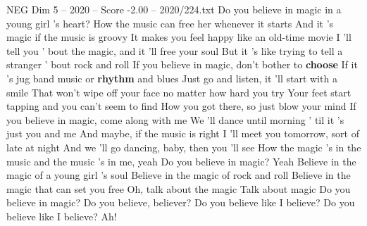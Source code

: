 \begin{textsample}{NEG Dim 5 – 2020 – Score -2.00 – 2020/224.txt}  \label{ex:f5_neg_021}
Do you believe in magic in a young girl 's heart?
How the music can free her whenever it starts And it 's magic if the music is groovy It makes you feel happy like an old-time movie I 'll tell you ' bout the magic, and it 'll free your soul But it 's like trying to tell a stranger ' bout rock and roll If you believe in magic, don't bother to \textbf{choose} If it 's jug band music or \textbf{rhythm} and blues Just go and listen, it 'll start with a smile That won't wipe off your face no matter how hard you try Your feet start tapping and you can't seem to find How you got there, so just blow your mind If you believe in magic, come along with me We 'll dance until morning ' til it 's just you and me And maybe, if the music is right I 'll meet you tomorrow, sort of late at night And we 'll go dancing, baby, then you 'll see How the magic 's in the music and the music 's in me, yeah Do you believe in magic?
Yeah Believe in the magic of a young girl 's soul Believe in the magic of rock and roll Believe in the magic that can set you free Oh, talk about the magic Talk about magic Do you believe in magic?
Do you believe, believer?
Do you believe like I believe?
Do you believe like I believe?
Ah!

\end{textsample}

